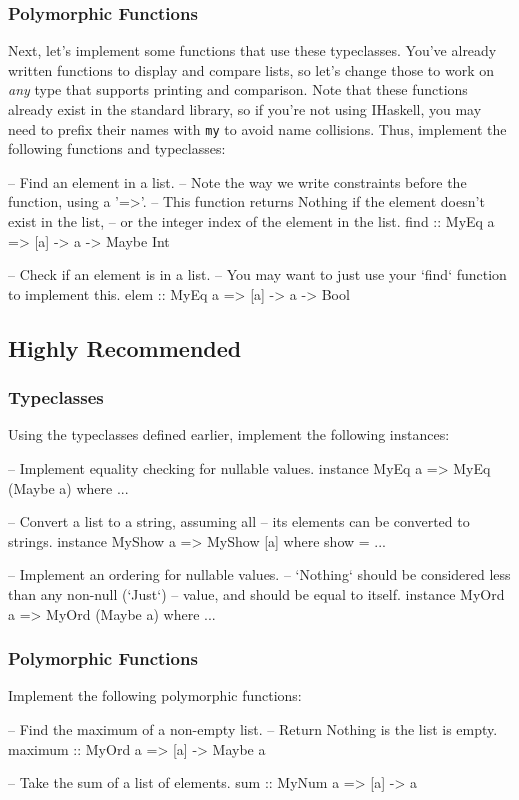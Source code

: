 \documentclass{article}
\begin{document}
\subsubsection*{Polymorphic Functions}
Next, let's implement some functions that use these typeclasses. You've already written functions to
display and compare lists, so let's change those to work on \emph{any} type that supports printing
and comparison. Note that these functions already exist in the standard library, so if you're not
using IHaskell, you may need to prefix their names with \texttt{my} to avoid name collisions.
Thus, implement the following functions and typeclasses:
\begin{haskellcode}
-- Find an element in a list.
-- Note the way we write constraints before the function, using a '=>'.
-- This function returns Nothing if the element doesn't exist in the list,
-- or the integer index of the element in the list.
find :: MyEq a => [a] -> a -> Maybe Int

-- Check if an element is in a list.
-- You may want to just use your `find` function to implement this.
elem :: MyEq a => [a] -> a -> Bool
\end{haskellcode}

\subsection*{Highly Recommended}

\subsubsection*{Typeclasses}
Using the typeclasses defined earlier, implement the following instances:
\begin{haskellcode}
-- Implement equality checking for nullable values.
instance MyEq a => MyEq (Maybe a) where
  ...

-- Convert a list to a string, assuming all 
-- its elements can be converted to strings.
instance MyShow a => MyShow [a] where
  show = ... 

-- Implement an ordering for nullable values.
-- `Nothing` should be considered less than any non-null (`Just`)
-- value, and should be equal to itself.
instance MyOrd a => MyOrd (Maybe a) where
  ...
\end{haskellcode}

\subsubsection*{Polymorphic Functions}
Implement the following polymorphic functions:
\begin{haskellcode}
-- Find the maximum of a non-empty list. 
-- Return Nothing is the list is empty.
maximum :: MyOrd a => [a] -> Maybe a

-- Take the sum of a list of elements.
sum :: MyNum a => [a] -> a
\end{haskellcode}
\end{document}
